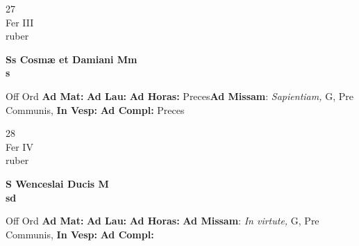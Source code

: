 \documentclass[10pt, openany]{book}
\begin{document}
        \begin{center}
            \begin{minipage}{3.5in}
                \vspace{2em}
                \begin{minipage}{0.5in}
                    {\Huge 27} \\
                    {\normalsize Fer III} \\
                    {\normalsize ruber}
                \end{minipage}
                \begin{minipage}{3.0in}
                    \textbf{ \large Ss Cosmæ et Damiani Mm \\
                    \textnormal{\normalsize s}} \\ 
                \end{minipage}
                \begin{justify}Off Ord
                    \textbf{Ad Mat: }
                    \textbf{Ad Lau: }
                    \textbf{Ad Horas: }Preces\textbf{Ad Missam}: \textit{Sapientiam,} G, Pre Communis,  
                    \textbf{In Vesp: }
                    \textbf{Ad Compl: }Preces
                \end{justify}
            \end{minipage}
        \end{center}
    
        \begin{center}
            \begin{minipage}{3.5in}
                \vspace{2em}
                \begin{minipage}{0.5in}
                    {\Huge 28} \\
                    {\normalsize Fer IV} \\
                    {\normalsize ruber}
                \end{minipage}
                \begin{minipage}{3.0in}
                    \textbf{ \large S Wenceslai Ducis M \\
                    \textnormal{\normalsize sd}} \\ 
                \end{minipage}
                \begin{justify}Off Ord
                    \textbf{Ad Mat: }
                    \textbf{Ad Lau: }
                    \textbf{Ad Horas: }\textbf{Ad Missam}: \textit{In virtute,} G, Pre Communis,  
                    \textbf{In Vesp: }
                    \textbf{Ad Compl: }
                \end{justify}
            \end{minipage}
        \end{center}
    
\end{document}
